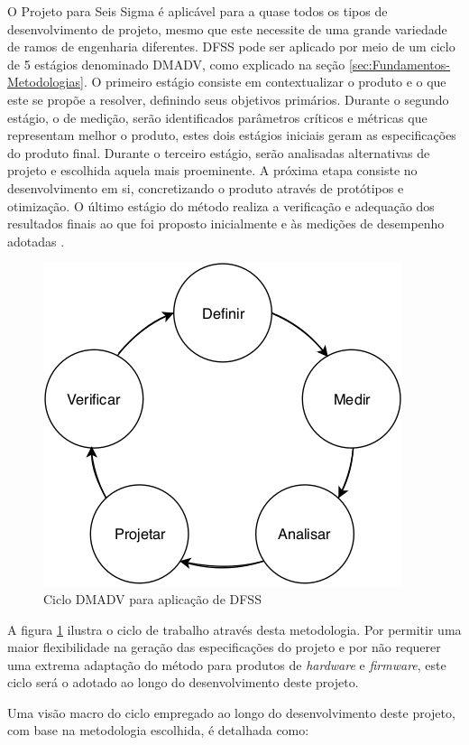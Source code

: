 O Projeto para Seis Sigma é aplicável para a quase todos os tipos de desenvolvimento de projeto, mesmo que este necessite de uma grande variedade de ramos de 
engenharia diferentes. DFSS pode ser aplicado por meio de um ciclo de 5 estágios denominado DMADV, como explicado na seção \ref{sec:Fundamentos-Metodologias}.
O primeiro estágio consiste em contextualizar o produto e o que este se propõe a resolver, definindo seus objetivos primários. Durante o segundo estágio, 
o de medição, serão identificados parâmetros críticos e métricas que representam melhor o produto, estes dois estágios iniciais geram as especificações 
do produto final. Durante o terceiro estágio, serão analisadas alternativas de projeto e escolhida aquela mais proeminente. A próxima etapa consiste no desenvolvimento
em si, concretizando o produto através de protótipos e otimização. O último estágio do método realiza a verificação e adequação dos resultados finais ao que foi
proposto inicialmente e às medições de desempenho adotadas \cite{maass2009applying}.

\begin{figure}[h]
\caption{Ciclo DMADV para aplicação de DFSS}    
\begin{centering}
\includegraphics[width=0.5\columnwidth]{images/meth/DMADV.png}
\par\end{centering}

\label{fig:DMADV}
\end{figure}

A figura \ref{fig:DMADV} ilustra o ciclo de trabalho através desta metodologia. Por permitir uma maior flexibilidade na geração das especificações do projeto e
por não requerer uma extrema adaptação do método para produtos de \textit{hardware} e \textit{firmware}, este ciclo será o adotado ao longo do desenvolvimento 
deste projeto. 

Uma visão macro do ciclo empregado ao longo do desenvolvimento deste projeto, com base na metodologia escolhida, é detalhada como:

